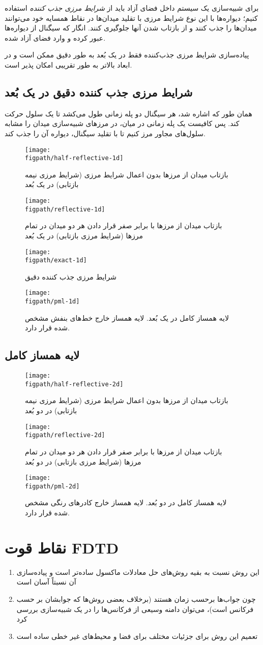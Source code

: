 \documentclass[12pt,a4paper]{article}
\newcommand{\figpath}{../figures}
\newcommand{\figwidth}{0.9\linewidth}
\begin{document}
	برای شبیه‌سازی یک سیستم داخل فضای آزاد باید از \emph{شرایط مرزی جذب کننده} استفاده کنیم؛
	دیواره‌ها با این نوع شرایط مرزی با تقلید میدان‌ها در نقاط همسایه خود می‌توانند میدان‌ها را جذب کنند و از بازتاب شدن آنها جلوگیری کنند.
	انگار که سیگنال از دیواره‌ها عبور کرده و وارد فضای آزاد شده.
	
	پیاده‌سازی شرایط مرزی جذب‌کننده فقط در یک بُعد به طور دقیق ممکن است و در ابعاد بالاتر به طور تقریبی امکان پذیر است.
	\subsection{شرایط مرزی جذب کننده دقیق در یک بُعد}
	همان طور که اشاره شد، هر سیگنال دو پله زمانی طول می‌کشد تا یک سلول حرکت کند.
	پس کافیست یک پله زمانی در میان، در مرزهای شبیه‌سازی میدان را مشابه سلول‌های مجاور مرز کنیم تا با تقلید سیگنال، دیواره آن را جذب کند.
	\begin{figure}
		\centering
		\texttt{[image: \\figpath/half-reflective-1d]}
		\caption{بازتاب میدان از مرزها بدون اعمال شرایط مرزی (شرایط مرزی نیمه بازتابی) در یک بُعد}
		\texttt{[image: \\figpath/reflective-1d]}
		\caption{بازتاب میدان از مرزها با برابر صفر قرار دادن هر دو میدان در تمام مرزها (شرایط مرزی بازتابی) در یک بُعد}
	\end{figure}
	\begin{figure}
		\centering
		\texttt{[image: \\figpath/exact-1d]}
		\caption{شرایط مرزی جذب کننده دقیق}
		\texttt{[image: \\figpath/pml-1d]}
		\caption{لایه همساز کامل در یک بُعد. لایه همساز خارج خط‌های بنفش مشخص شده قرار دارد.}
	\end{figure}
	\FloatBarrier\subsection{لایه همساز کامل}
	\begin{figure}
		\centering
		\texttt{[image: \\figpath/half-reflective-2d]}
		\caption{بازتاب میدان از مرزها بدون اعمال شرایط مرزی (شرایط مرزی نیمه بازتابی) در دو بُعد}
		\texttt{[image: \\figpath/reflective-2d]}
		\caption{بازتاب میدان از مرزها با برابر صفر قرار دادن هر دو میدان در تمام مرزها (شرایط مرزی بازتابی) در دو بُعد}
		\texttt{[image: \\figpath/pml-2d]}
		\caption{لایه همساز کامل در دو بُعد. لایه همساز خارج کادرهای رنگی مشخص شده قرار دارد.}
	\end{figure}
	\FloatBarrier\section{نقاط قوت FDTD}
	\begin{enumerate}
		\item این روش نسبت به بقیه روش‌های حل معادلات ماکسول ساده‌تر است و پیاده‌سازی آن نسبتاً آسان است
		\item چون جواب‌ها برحسب زمان هستند (برخلاف بعضی روش‌ها که جوابشان بر حسب فرکانس است)، می‌توان دامنه وسیعی از فرکانس‌ها را در یک شبیه‌سازی بررسی کرد
		\item تعمیم این روش برای جزئیات مختلف برای فضا و محیط‌های غیر خطی ساده است 
	\end{enumerate}
\end{document}
